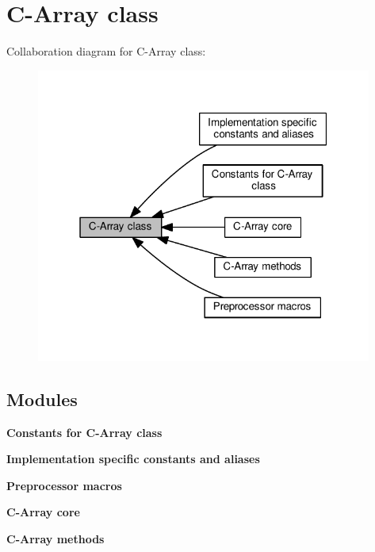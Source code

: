 \section{C-\/\+Array class}
\label{group__carray__group}
Collaboration diagram for C-\/\+Array class\+:\nopagebreak
\begin{figure}[H]
\begin{center}
\leavevmode
\includegraphics[width=313pt]{group__carray__group}
\end{center}
\end{figure}
\subsection*{Modules}
\begin{DoxyCompactItemize}
\item 
{\bf Constants for C-\/\+Array class}
\item 
{\bf Implementation specific constants and aliases}
\item 
{\bf Preprocessor macros}
\item 
{\bf C-\/\+Array core}
\item 
{\bf C-\/\+Array methods}
\end{DoxyCompactItemize}
